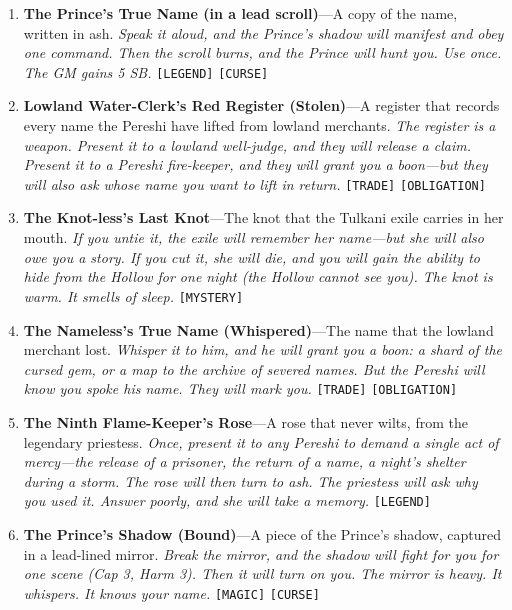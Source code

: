 \begin{enumerate}
\item \textbf{The Prince's True Name (in a lead scroll)}---A copy of the name, written in ash.
  \hfill \textit{Speak it aloud, and the Prince's shadow will manifest and obey one command. Then the scroll burns, and the Prince will hunt you. Use once. The GM gains 5 SB.} \texttt{[LEGEND]} \texttt{[CURSE]}
\item \textbf{Lowland Water-Clerk's Red Register (Stolen)}---A register that records every name the Pereshi have lifted from lowland merchants.
  \hfill \textit{The register is a weapon. Present it to a lowland well-judge, and they will release a claim. Present it to a Pereshi fire-keeper, and they will grant you a boon---but they will also ask whose name you want to lift in return.} \texttt{[TRADE]} \texttt{[OBLIGATION]}
\item[J] \textbf{The Knot-less's Last Knot}---The knot that the Tulkani exile carries in her mouth.
  \hfill \textit{If you untie it, the exile will remember her name---but she will also owe you a story. If you cut it, she will die, and you will gain the ability to hide from the Hollow for one night (the Hollow cannot see you). The knot is warm. It smells of sleep.} \texttt{[MYSTERY]}
\item[Q] \textbf{The Nameless's True Name (Whispered)}---The name that the lowland merchant lost.
  \hfill \textit{Whisper it to him, and he will grant you a boon: a shard of the cursed gem, or a map to the archive of severed names. But the Pereshi will know you spoke his name. They will mark you.} \texttt{[TRADE]} \texttt{[OBLIGATION]}
\item[K] \textbf{The Ninth Flame-Keeper's Rose}---A rose that never wilts, from the legendary priestess.
  \hfill \textit{Once, present it to any Pereshi to demand a single act of mercy---the release of a prisoner, the return of a name, a night's shelter during a storm. The rose will then turn to ash. The priestess will ask why you used it. Answer poorly, and she will take a memory.} \texttt{[LEGEND]}
\item[A] \textbf{The Prince's Shadow (Bound)}---A piece of the Prince's shadow, captured in a lead-lined mirror.
  \hfill \textit{Break the mirror, and the shadow will fight for you for one scene (Cap 3, Harm 3). Then it will turn on you. The mirror is heavy. It whispers. It knows your name.} \texttt{[MAGIC]} \texttt{[CURSE]}
\end{enumerate}

